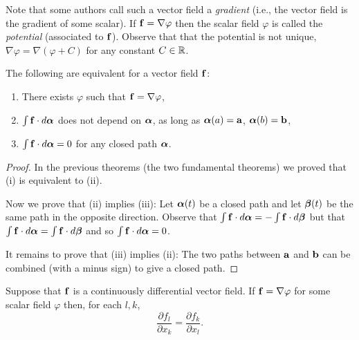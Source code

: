 Note that some authors call such a vector field a \emph{gradient} (i.e., the vector field is the gradient of some scalar).
If \(\ff = \nabla \varphi\) then the scalar field \(\varphi\) is called the \emph{potential} (associated to \(\ff\)).
Observe that that the potential is not unique,
\(\nabla \varphi = \nabla(\varphi + C)\) for any constant \(C \in \bR\).


\begin{theorem}
    The following are equivalent for a vector field \(\ff\):
    \begin{enumerate}[label=\textnormal{(\roman*)}]
        \item There exists \(\varphi\) such that \(\ff = \nabla \varphi\),
        \item \(\int \ff \cdot d\aalpha\) does not depend on \(\aalpha\), as long as \(\aalpha(a)=\aa\), \(\aalpha(b)=\bb\),
        \item \(\int \ff \cdot d\aalpha = 0\) for any closed path \(\aalpha\).
    \end{enumerate}
\end{theorem}

\begin{proof}
        In the previous theorems (the two fundamental theorems) we proved that (i) is equivalent to (ii).

        Now we prove that (ii) implies (iii):  
        Let \(\aalpha(t)\) be a closed path and let \(\bbeta(t)\) be the same path in the opposite direction. Observe that \(\int \ff \cdot d\aalpha = - \int \ff \cdot d \bbeta\) but that \(\int \ff \cdot d \aalpha = \int \ff \cdot d \bbeta\) and so \(\int \ff \cdot d \aalpha = 0\).

        It remains to prove that (iii) implies (ii): The two paths between \(\aa\) and \(\bb\) can be combined (with a minus sign) to give a closed path.
\end{proof}

\begin{theorem}
    Suppose that \(\ff\) is a continuously differential vector field.
    If \(\ff = \nabla \varphi\) for some scalar field \(\varphi\) then, for each \(l,k\),
    \[
        \frac{\partial f_l}{\partial x_k} = \frac{\partial f_k}{\partial x_l}.
    \]
\end{theorem}


